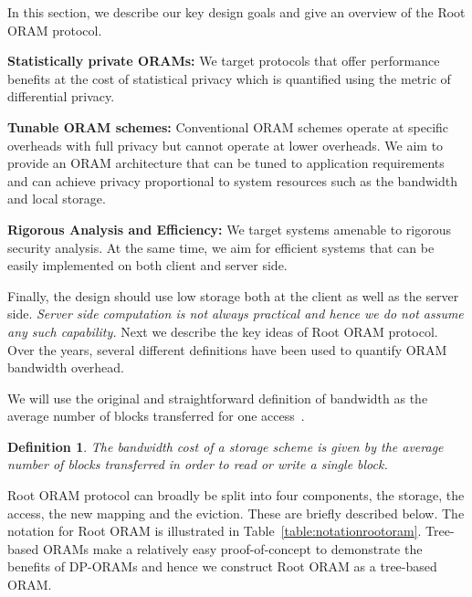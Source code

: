 \documentclass[USenglish,oneside,twocolumn]{article}
\makeatletter
\newcommand{\ourprotocol}{Root ORAM}
\let\origsubsection\subsection
\renewcommand\subsection{\@ifstar{\starsubsection}{\nostarsubsection}}
\newcommand\nostarsubsection[1]
{\subsectionprelude\origsubsection{#1}\subsectionpostlude}
\newcommand\starsubsection[1]
{\subsectionprelude\origsubsection*{#1}\subsectionpostlude}
\newcommand\subsectionprelude{\vspace{-1.5em}}
\newcommand\subsectionpostlude{\vspace{-1em}}
\newtheorem{defn}{Definition}
\makeatother
\begin{document}
In this section, we describe our key design goals and give an overview of the \ourprotocol{} protocol.

\subsection{Design Goals}

\noindent \textbf{Statistically private ORAMs: }We target protocols that offer performance benefits at the cost of statistical privacy which is quantified using the metric of differential privacy.

\noindent \textbf{Tunable ORAM schemes: }Conventional ORAM schemes operate at specific overheads with full privacy but cannot operate at lower overheads. We aim to provide an ORAM architecture that can be tuned to application requirements and can achieve privacy proportional to system resources such as the bandwidth and local storage. 


\noindent \textbf{Rigorous Analysis and Efficiency: }We target systems amenable to rigorous security analysis. At the same time, we aim for efficient systems that can be easily implemented on both client and server side.

Finally, the design should use low storage both at the client as well as the server side. \emph{Server side computation is not always practical and hence we do not assume any such capability.} Next we describe the key ideas of \ourprotocol{} protocol. Over the years, several different definitions have been used to quantify ORAM bandwidth overhead. 

We will use the original and straightforward definition of bandwidth as the average number of blocks transferred for one access~\cite{burstoram}.

\begin{defn}\label{def:bandwidth}
\textit{The bandwidth cost of a storage scheme is given by the average number of blocks transferred in order to read or write a single block.}
\end{defn}





\subsection{Approach Overview}
\ourprotocol{} protocol can broadly be split into four components, the storage, the access, the new mapping and the eviction. These are briefly described below. The notation for Root ORAM is illustrated in Table~\ref{table:notationrootoram}. Tree-based ORAMs make a relatively easy proof-of-concept to demonstrate the benefits of DP-ORAMs and hence we construct \ourprotocol{} as a tree-based ORAM.
\end{document}

